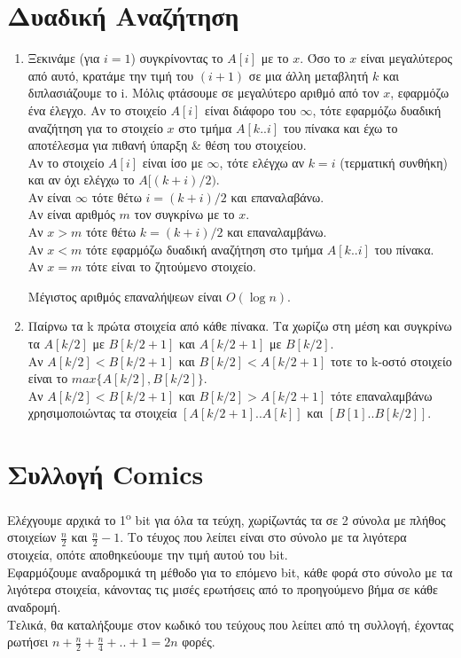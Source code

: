 \documentclass[a4paper,10pt]{article} \usepackage{anysize}
\newcommand{\tab}{\hspace*{3em}}
\begin{document}
\section{Δυαδική Αναζήτηση}
\begin{enumerate}
\item Ξεκινάμε (για $i=1$) συγκρίνοντας το $A[i]$ με το $x$. Όσο το $x$ είναι
μεγαλύτερος από αυτό, κρατάμε την τιμή του $(i+1)$ σε μια άλλη μεταβλητή $k$ και
διπλασιάζουμε το i.
Μόλις φτάσουμε σε μεγαλύτερο αριθμό από τον $x$, εφαρμόζω ένα έλεγχο.
Αν το στοιχείο $A[i]$ είναι διάφορο του $\infty$, τότε εφαρμόζω δυαδική αναζήτηση
για το στοιχείο $x$ στο τμήμα $Α[k..i]$ του πίνακα και έχω το αποτέλεσμα για
πιθανή ύπαρξη \& θέση του στοιχείου. \\
Αν το στοιχείο $A[i]$ είναι ίσο με $\infty$, τότε ελέγχω αν $k=i$ (τερματική
συνθήκη) και αν όχι ελέγχω το $A[(k+i)/2)$. \\
\tab Αν είναι $\infty$ τότε θέτω $i= (k+i)/2$ και επαναλαβάνω.\\
\tab Αν είναι αριθμός $m$ τον συγκρίνω με το $x$.\\
\tab \tab Αν $x>m$ τότε θέτω $k= (k+i)/2$ και επαναλαμβάνω.\\
\tab \tab Αν $x<m$ τότε εφαρμόζω δυαδική αναζήτηση στο τμήμα $A[k..i]$ του
πίνακα.\\
\tab \tab Αν $x=m$ τότε είναι το ζητούμενο στοιχείο.

Μέγιστος αριθμός επαναλήψεων είναι $O(\log{n})$.

\item Παίρνω τα k πρώτα στοιχεία από κάθε πίνακα. Τα χωρίζω στη μέση και
συγκρίνω τα $A[k/2]$ με $B[k/2+1]$ και $A[k/2+1]$ με $B[k/2]$. \\
Αν $A[k/2]<B[k/2+1]$ και $B[k/2]<A[k/2+1]$ τοτε το k-οστό στοιχείο είναι το
$max\{A[k/2],B[k/2]\}$. \\
Αν $A[k/2]<B[k/2+1]$ και $B[k/2]>A[k/2+1]$ τότε επαναλαμβάνω χρησιμοποιώντας
τα στοιχεία $[A[k/2+1]..A[k]]$ και $[B[1]..B[k/2]]$.
\end{enumerate}

\section{Συλλογή Comics}
Ελέχγουμε αρχικά το 1\textsuperscript{o} bit για όλα τα τεύχη, χωρίζωντάς τα
σε 2 σύνολα με πλήθος στοιχείων $\frac{n}{2}$ και $\frac{n}{2}-1$. Το τέυχος
που λείπει είναι στο σύνολο με τα λιγότερα στοιχεία, οπότε αποθηκεύουμε την
τιμή αυτού του bit. \\
Εφαρμόζουμε αναδρομικά τη μέθοδο για το επόμενο bit, κάθε φορά στο σύνολο με τα λιγότερα στοιχεία,
κάνοντας τις μισές ερωτήσεις από το προηγούμενο βήμα σε κάθε αναδρομή. \\
Τελικά, θα καταλήξουμε στον κωδικό του τεύχους που λείπει από τη συλλογή, έχοντας
ρωτήσει $n+\frac{n}{2}+\frac{n}{4}+..+1= 2n$ φορές.
\end{document}
